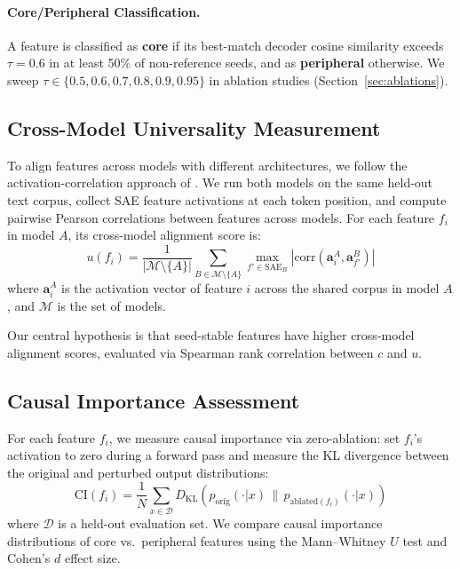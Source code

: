 \documentclass[final]{article}
\newcommand{\cscore}{c}
\newcommand{\uscore}{u}
\begin{document}
\paragraph{Core/Peripheral Classification.} A feature is classified as \textbf{core} if its best-match decoder cosine similarity exceeds $\tau = 0.6$ in at least 50\% of non-reference seeds, and as \textbf{peripheral} otherwise. We sweep $\tau \in \{0.5, 0.6, 0.7, 0.8, 0.9, 0.95\}$ in ablation studies (Section~\ref{sec:ablations}).

\subsection{Cross-Model Universality Measurement}

To align features across models with different architectures, we follow the activation-correlation approach of \citet{lan2024universal}. We run both models on the same held-out text corpus, collect SAE feature activations at each token position, and compute pairwise Pearson correlations between features across models. For each feature $f_i$ in model $A$, its cross-model alignment score is:
\begin{equation}
    \uscore(f_i) = \frac{1}{|\mathcal{M} \setminus \{A\}|} \sum_{B \in \mathcal{M} \setminus \{A\}} \max_{f' \in \text{SAE}_B} |\text{corr}(\mathbf{a}_i^A, \mathbf{a}_{f'}^B)|
    \label{eq:universality}
\end{equation}
where $\mathbf{a}_i^A$ is the activation vector of feature $i$ across the shared corpus in model $A$, and $\mathcal{M}$ is the set of models.

Our central hypothesis is that seed-stable features have higher cross-model alignment scores, evaluated via Spearman rank correlation between $\cscore$ and $\uscore$.

\subsection{Causal Importance Assessment}

For each feature $f_i$, we measure causal importance via zero-ablation: set $f_i$'s activation to zero during a forward pass and measure the KL divergence between the original and perturbed output distributions:
\begin{equation}
    \text{CI}(f_i) = \frac{1}{N} \sum_{x \in \mathcal{D}} D_{\text{KL}}\!\left(p_{\text{orig}}(\cdot | x) \,\|\, p_{\text{ablated}(f_i)}(\cdot | x)\right)
    \label{eq:causal}
\end{equation}
where $\mathcal{D}$ is a held-out evaluation set. We compare causal importance distributions of core vs.\ peripheral features using the Mann--Whitney $U$ test and Cohen's $d$ effect size.
\end{document}
